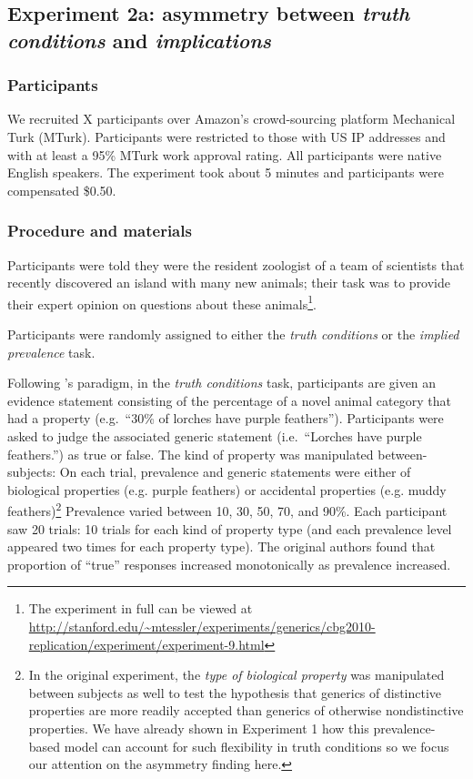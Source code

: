 \documentclass[10pt,letterpaper]{article}
\begin{document}

\subsection{Experiment 2a: asymmetry between \emph{truth conditions} and \emph{implications}}


\subsubsection{Participants}

We recruited X participants over Amazon's crowd-sourcing platform Mechanical Turk (MTurk).  Participants were restricted to those with US IP addresses and with at least a 95\% MTurk work approval rating. All participants were native English speakers. The experiment took about 5 minutes and participants were compensated \$0.50.

\subsubsection{Procedure and materials}

Participants were told they were the resident zoologist of a team of scientists that recently discovered an island with many new animals; their task was to provide their expert opinion on questions about these animals\footnote{The experiment in full can be viewed at \url{http://stanford.edu/~mtessler/experiments/generics/cbg2010-replication/experiment/experiment-9.html}}. 

Participants were randomly assigned to either the \emph{truth conditions} or the \emph{implied prevalence} task.

Following \citeauthor{Cimpian2010}'s paradigm, in the \emph{truth conditions} task, participants are given an evidence statement consisting of the percentage of a novel animal category that had a property (e.g.~``30\% of lorches have purple feathers''). Participants were asked to judge the associated generic statement (i.e.~``Lorches have purple feathers.'') as true or false. The kind of property was manipulated between-subjects: On each trial, prevalence and generic statements were either of biological properties (e.g. purple feathers) or accidental properties (e.g. muddy feathers)\footnote{In the original experiment, the \emph{type of biological property} was manipulated between subjects as well to test the hypothesis that generics of distinctive properties are more readily accepted than generics of otherwise nondistinctive properties.  We have already shown in Experiment 1 how this prevalence-based model can account for such flexibility in truth conditions so we focus our attention on the asymmetry finding here.} Prevalence varied between 10, 30, 50, 70, and 90\%. Each participant saw 20 trials: 10 trials for each kind of property type (and each prevalence level appeared two times for each property type). The original authors found that proportion of ``true'' responses increased monotonically as prevalence increased. 
\end{document}
